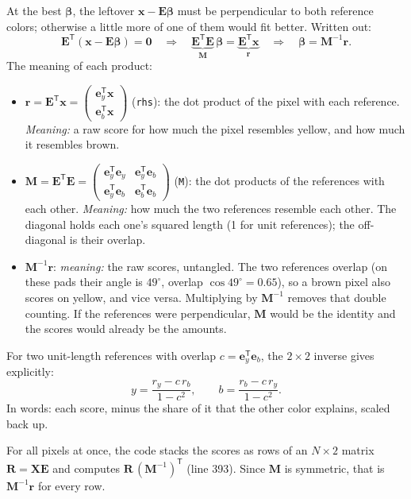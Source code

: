 \documentclass[11pt,letterpaper]{article}
\newcommand{\code}[1]{\texttt{#1}}
\newcommand{\vx}{\mathbf{x}}
\newcommand{\vr}{\mathbf{r}}
\newcommand{\ey}{\mathbf{e}_y}
\newcommand{\eb}{\mathbf{e}_b}
\newcommand{\mX}{\mathbf{X}}
\newcommand{\mE}{\mathbf{E}}
\newcommand{\mM}{\mathbf{M}}
\newcommand{\T}{^{\mathsf{T}}}
\newcommand{\inv}{^{-1}}
\begin{document}
At the best $\bm\beta$, the leftover $\vx - \mE\bm\beta$ must be
perpendicular to both reference colors; otherwise a little more of one of
them would fit better.  Written out:
\begin{equation}
\mE\T(\vx - \mE\bm\beta) = \mathbf 0
\quad\Longrightarrow\quad
\underbrace{\mE\T\mE}_{\mM}\,\bm\beta = \underbrace{\mE\T\vx}_{\vr}
\quad\Longrightarrow\quad
\bm\beta = \mM\inv\vr .
\label{eq:normal}
\end{equation}
The meaning of each product:
\begin{itemize}
\item $\vr = \mE\T\vx = \begin{pmatrix}\ey\T\vx\\ \eb\T\vx\end{pmatrix}$
  (\code{rhs}): the dot product of the pixel with each reference.
  \emph{Meaning:} a raw score for how much the pixel resembles yellow, and
  how much it resembles brown.
\item $\mM = \mE\T\mE = \begin{pmatrix}\ey\T\ey & \ey\T\eb\\ \ey\T\eb &
  \eb\T\eb\end{pmatrix}$ (\code{M}): the dot products of the references
  with each other.  \emph{Meaning:} how much the two references resemble
  each other.  The diagonal holds each one's squared length (1 for unit
  references); the off-diagonal is their overlap.
\item $\mM\inv\vr$: \emph{meaning:} the raw scores, untangled.  The two
  references overlap (on these pads their angle is $49^\circ$, overlap
  $\cos 49^\circ = 0.65$), so a brown pixel also scores on yellow, and vice
  versa.  Multiplying by $\mM\inv$ removes that double counting.  If the
  references were perpendicular, $\mM$ would be the identity and the scores
  would already be the amounts.
\end{itemize}
For two unit-length references with overlap $c = \ey\T\eb$, the $2\times2$
inverse gives explicitly:
\begin{equation}
y = \frac{r_y - c\,r_b}{1 - c^2},\qquad
b = \frac{r_b - c\,r_y}{1 - c^2}.
\label{eq:explicit}
\end{equation}
In words: each score, minus the share of it that the other color explains,
scaled back up.

For all pixels at once, the code stacks the scores as rows of an $N\times2$
matrix $\mathbf R = \mX\mE$ and computes $\mathbf R\,(\mM\inv)\T$ (line 393).
Since $\mM$ is symmetric, that is $\mM\inv\vr$ for every row.
\end{document}

